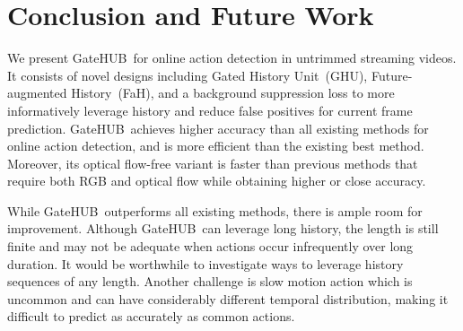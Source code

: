 \documentclass[10pt,twocolumn,letterpaper]{article}
\newcommand{\methodname}{GateHUB}
\begin{document}
 \section{Conclusion and Future Work}
We present \methodname~for online action detection in untrimmed streaming videos. It consists of novel designs including Gated History Unit~(GHU), Future-augmented History~(FaH), and a background suppression loss to more informatively leverage history and reduce false positives for current frame prediction. \methodname~achieves higher accuracy than all existing methods for online action detection, and is more efficient than the existing best method. Moreover, its optical flow-free variant is  faster than previous methods that require both RGB and optical flow while obtaining higher or close accuracy.  

While \methodname~outperforms all existing methods, there is ample room for improvement. Although \methodname~can leverage long history, the length is still finite and may not be adequate when actions occur infrequently over long duration. It would be worthwhile to investigate ways to leverage history sequences of any length. Another challenge is slow motion action which is uncommon and can have considerably different temporal distribution, making it difficult to predict as accurately as common actions.
\end{document}
